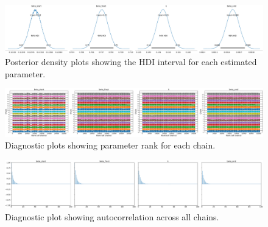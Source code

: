 \documentclass[11pt]{article}
\begin{document}
    \begin{landscape}
    \begin{figure}
        \centering
        \includegraphics[scale=0.2]{model_posterior}
        \caption{Posterior density plots showing the HDI interval for each estimated parameter.}
        \label{model_posterior}
    \end{figure}
    \begin{figure}
        \centering
        \includegraphics[scale=0.2]{model_rank}
        \caption{Diagnostic plots showing parameter rank for each chain.}
        \label{model_rank}
    \end{figure}
    \begin{figure}
        \centering
        \includegraphics[scale=0.2]{model_autocorrelation}
        \caption{Diagnostic plot showing autocorrelation across all chains.}
        \label{model_autocorrelation}
    \end{figure}
    \end{landscape}
\end{document}
